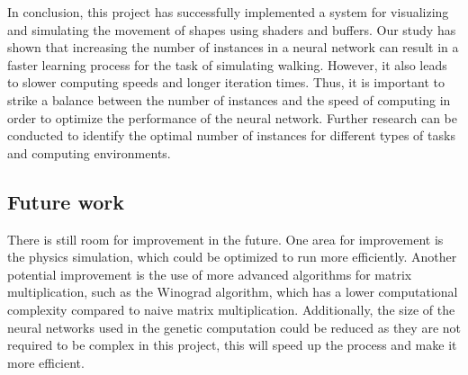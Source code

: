     In conclusion, this project has successfully implemented a system for visualizing and simulating the movement of shapes using shaders and buffers. Our study has shown that increasing the number of instances in a neural network can result in a faster learning process for the task of simulating walking. However, it also leads to slower computing speeds and longer iteration times. Thus, it is important to strike a balance between the number of instances and the speed of computing in order to optimize the performance of the neural network. Further research can be conducted to identify the optimal number of instances for different types of tasks and computing environments.

\subsection{\LARGE Future work}

    There is still room for improvement in the future. One area for improvement is the physics simulation, which could be optimized to run more efficiently. Another potential improvement is the use of more advanced algorithms for matrix multiplication, such as the Winograd algorithm, which has a lower computational complexity compared to naive matrix multiplication. Additionally, the size of the neural networks used in the genetic computation could be reduced as they are not required to be complex in this project, this will speed up the process and make it more efficient.
